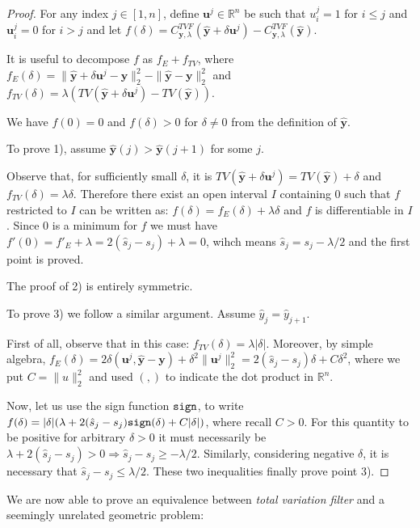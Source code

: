 \documentclass{article}
\theoremstyle{definition}
\def\*#1{\mathbf{#1}}
\def\R{\mathbb{R}}
\begin{document}
\begin{proof}
  For any index $j \in [1, n]$, define $\*u^j \in \R^n$ be such that $u^j_i = 1$ for $i \leq j$ and $\*u^j_i = 0$ for $i > j$ and let $f(\delta) = C^{TVF}_{\*y, \lambda}(\hat{\*y} + \delta \*u^j) - C^{TVF}_{\*y, \lambda}(\hat{\*y})$.
  
  It is useful to decompose $f$ as $f_E + f_{TV}$, where $f_E(\delta) = \|\hat{\*y} + \delta \*u^j - \*y\|^2_2 - \|\hat{\*y} - \*y\|^2_2$ and $f_{TV} (\delta) = \lambda (TV(\hat{\*y} + \delta \*u^j) - TV(\hat{\*y}))$.

  We have $f(0) = 0$ and $f(\delta) > 0$ for $\delta \neq 0$ from the definition of $\hat{\*y}$. 

  To prove 1), assume $\hat{\*y}(j) > \hat{\*y}(j+1)$ for some $j$.

  Observe that, for sufficiently small $\delta$, it is $TV (\hat{\*y} + \delta \*u^j) =
  TV(\hat{\*y}) + \delta$ and $f_{TV} (\delta) = \lambda \delta$. Therefore there exist an open interval $I$ containing $0$ such that $f$ restricted to $I$ can be written as: $f(\delta) = f_E(\delta) + \lambda \delta$ and $f$ is differentiable in $I$. Since $0$ is a minimum for $f$ we must have $f'(0) = f'_{E} + \lambda = 2 (\hat{s}_j - s_j) + \lambda = 0$, wihch means $\hat{s}_j = s_j - \lambda / 2$ and the first point is proved.

  The proof of 2) is entirely symmetric.

  To prove 3) we follow a similar argument. Assume $\hat{y}_j = \hat{y}_{j + 1}$. 

  First of all, observe that in this case: $f_{TV} (\delta) = \lambda |\delta|$.
  Moreover, by simple algebra, $f_E(\delta) = 2\delta (\*u^j, \hat{\*y} - \*y) + \delta^2 \|\*u^j\|^2_2 = 2 (\hat{s}_j - s_j) \delta + C \delta^2$, where we put $C = \|u\|^2_2$ and used $(,)$ to indicate the dot product in $\R^n$.

  Now, let us use the sign function ${\tt sign}$, to write $f(\delta) = |\delta| (\lambda + 2 (\hat{s}_j - s_j){\tt sign} (\delta) + C |\delta|)$, where recall $C > 0$. For this quantity to be positive for arbitrary $\delta > 0$ it must necessarily be $\lambda + 2 (\hat{s}_j  - s_j) > 0 \Rightarrow \hat{s}_j - s_j \geq -\lambda / 2$. Similarly, considering negative $\delta$, it is necessary that $\hat{s}_j - s_j \leq \lambda / 2$. These two inequalities finally prove point 3).    
\end{proof}

We are now able to prove an equivalence between {\em total variation filter} and a seemingly unrelated geometric problem:
\end{document}

